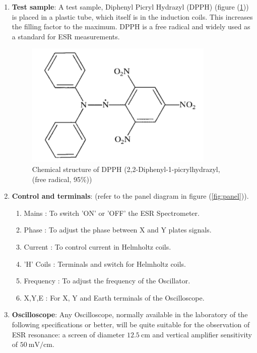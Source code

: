 \documentclass[%
 reprint,
nofootinbib,
 amsmath,amssymb,
 aps,
floatfix,
]{revtex4-2}
\begin{document}
\begin{enumerate}
        \item \textbf{Test sample}: A test sample, Diphenyl Picryl Hydrazyl (DPPH) (figure (\ref{fig:dpph})) is placed in a plastic tube, which itself is in the induction coils. This increases the filling factor to the maximum. DPPH is a free radical and widely used as a standard for ESR measurements.
        \begin{figure}
            \centering
            \includegraphics{Figures/dpph.png}
            \caption{Chemical structure of DPPH (2,2-Diphenyl-1-picrylhydrazyl, (free radical, 95\%))}
            \label{fig:dpph}
        \end{figure}
        \item \textbf{Control and terminals}: (refer to the panel diagram in figure (\ref{fig:panel})).
            \begin{enumerate}
                \item Mains : To switch 'ON' or 'OFF' the ESR Spectrometer.
                \item Phase : To adjust the phase between X and Y plates signals. 
                \item Current : To control current in Helmholtz coils. 
                \item 'H' Coils : Terminals and switch for Helmholtz coils. 
                \item Frequency : To adjust the frequency of the Oscillator. 
                \item X,Y,E : For X, Y and Earth terminals of the Oscilloscope.
            \end{enumerate}
        \item \textbf{Oscilloscope}: Any Oscilloscope, normally available in the laboratory of the following specifications or better, will be quite suitable for the observation of ESR resonance: a screen of diameter $\SI{12.5}{\centi \metre}$ and vertical amplifier sensitivity of $\SI{50}{\milli \volt \per \centi \metre}$.
    \end{enumerate}
     
\end{document}

